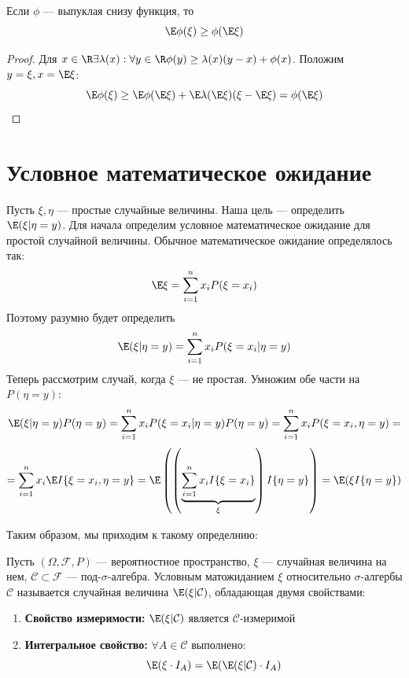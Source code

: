 \begin{theorem}
    Если \(\phi\) --- выпуклая снизу функция, то 
    \[\E\phi(\xi) \ge \phi(\E\xi)\]
\end{theorem}
\begin{proof}
    Для \(x \in \R \exists \lambda(x): \forall y \in \R \phi(y) \ge \lambda(x)(y - x) + \phi(x)\). Положим \(y = \xi, x = \E\xi\):
    \[\E\phi(\xi) \ge \E\phi(\E\xi) + \E\lambda(\E\xi)(\xi - \E\xi) = \phi(\E\xi)\]
\end{proof}

\section{Условное математическое ожидание}
Пусть \(\xi, \eta\) --- простые случайные величины. Наша цель --- определить \(\E(\xi | \eta = y)\). Для начала определим условное математическое ожидание для простой случайной величины. Обычное математическое ожидание определялось так:
\[\E\xi = \sum_{i = 1}^n x_i P(\xi = x_i)\]
Поэтому разумно будет определить
\[\E(\xi | \eta = y) = \sum_{i = 1}^n x_i P(\xi = x_i | \eta = y)\]
Теперь рассмотрим случай, когда \(\xi\) --- не простая. Умножим обе части на \(P(\eta = y)\):
\[\E(\xi | \eta = y)P(\eta = y) = \sum_{i = 1}^n x_i P(\xi = x_i | \eta = y)P(\eta = y) = \sum_{i = 1}^n x_i P(\xi = x_i, \eta = y) = \]
\[= \sum_{i = 1}^n x_i \E I\{\xi = x_i, \eta = y\} = \E\left( \left( \underbrace{\sum_{i = 1}^n x_i I\{\xi = x_i\}}_{\xi} \right)I\{\eta = y\} \right) = \E(\xi I\{\eta = y\})\]

Таким образом, мы приходим к такому определнию:
\begin{definition}
    Пусть \((\Omega, \mathcal{F}, P)\) --- вероятностное пространство, \(\xi\) --- случайная величина на нем, \(\mathcal{C} \subset \mathcal{F}\) --- под-\(\sigma\)-алгебра. Условным матожиданием \(\xi\) относительно \(\sigma\)-алгербы \(\mathcal{C}\) называется случайная величина \(\E(\xi | \mathcal{C})\), обладающая двумя свойствами:
    \begin{enumerate}
        \item \textbf{Свойство измеримости:} \(\E(\xi | \mathcal{C})\) является \(\mathcal{C}\)-измеримой
        \item \textbf{Интегральное свойство:} \(\forall A \in \mathcal{C}\) выполнено:
        \[\E(\xi \cdot I_A) = \E(\E(\xi | \mathcal{C}) \cdot I_A)\]
    \end{enumerate}
\end{definition}

